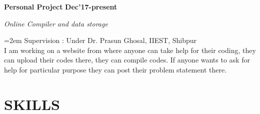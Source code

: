 \documentclass[paper=a4,fontsize=11pt]{scrartcl} %
\newcommand{\sepspace}{\vspace*{1em}}		%
\newcommand{\NewPart}[1]{\section*{\uppercase{#1}}}
\newcommand{\EducationEntry}[4]{
		\noindent \textbf{#1} \hfill      %
		\textbf{#2} \par  %
		\noindent \textit{#3} \par        %
		\noindent\hangindent=2em\hangafter=0 \small #4 %
		\normalsize \par}
\newcommand{\WorkEntry}[4]{				  %
		\noindent \textbf{#1} \hfill      %
		\textbf{#2} \par  %
		\noindent \textit{#3} \par              %
		\noindent\hangindent=2em\hangafter=0 \small #4 %
		\normalsize \par}
\newcommand{\hide}[1]
{}
\begin{document}
        \sepspace
        \sepspace
        \WorkEntry{Personal Project} %
            {Dec'17-present} %
            {Online Compiler and data storage} %
            {
                Supervision : Under Dr. Prasun Ghosal, IIEST, Shibpur\\I am working on a website from where anyone can take help for their coding, they can upload their codes there, they can compile codes. If anyone wants to ask for help for particular purpose they can post their problem statement there.%
            }
        \sepspace
        \sepspace

    \NewPart{Skills}%
    {}

            \hide{}%
            \hide{
            }
            \hide{}%
            \hide{
            }
\end{document}
